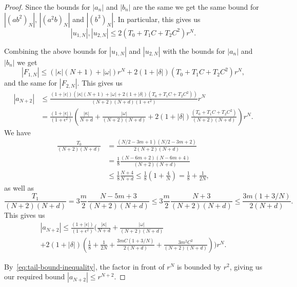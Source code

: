 \documentclass[11pt]{article}
\begin{document}
\begin{proof}
  Since the bounds for \(|a_n|\) and \(|b_n|\) are the same we get the
  same bound for \(|(ab^2)_N|\), \(|(a^2b)_N|\) and \(|(b^3)_N|\). In
  particular, this gives us
  \begin{equation*}
    |u_{1,N}|, |u_{2,N}| \leq 2(T_{0} + T_{1}C + T_{2}C^{2})r^{N}.
  \end{equation*}

  Combining the above bounds for \(|u_{1,N}|\) and \(|u_{2,N}|\) with
  the bounds for \(|a_n|\) and \(|b_n|\) we get
  \begin{equation*}
    |F_{1,N}| \leq (|\kappa|(N + 1) + |\omega|)r^{N} + 2(1 + |\delta|)(T_{0} + T_{1}C + T_{2}C^{2})r^{N},
  \end{equation*}
  and the same for \(|F_{2,N}|\). This gives us
  \begin{equation*}
    \begin{split}
      |a_{N + 2}|
      &\leq \frac{(1 + |\epsilon|)(|\kappa|(N + 1) + |\omega| + 2(1 + |\delta|)(T_{0} + T_{1}C + T_{2}C^{2}))}{(N + 2)(N + d)(1 + \epsilon^{2})}r^{N}\\
      &= \frac{(1 + |\epsilon|)}{(1 + \epsilon^{2})}\left(
        \frac{|\kappa|}{N + d}
        + \frac{|\omega|}{(N + 2)(N + d)}
        + 2(1 + |\delta|)\frac{(T_{0} + T_{1}C + T_{2}C^{2})}{(N + 2)(N + d)}
        \right)r^{N}.
    \end{split}
  \end{equation*}
  We have
  \begin{equation*}
    \begin{split}
      \frac{T_{0}}{(N + 2)(N + d)}
      &= \frac{(N/2 - 3m + 1)(N/2 - 3m + 2)}{2(N + 2)(N + d)}\\
      &= \frac{1}{8}\frac{(N - 6m + 2)(N - 6m + 4)}{(N + 2)(N + d)}\\
      &\leq \frac{1}{8}\frac{N + 4}{N + d}
        \leq \frac{1}{8}\left(1 + \frac{4}{N}\right)
        = \frac{1}{8} + \frac{1}{2N},
    \end{split}
  \end{equation*}
  as well as
  \begin{equation*}
    \frac{T_{1}}{(N + 2)(N + d)}
    = 3\frac{m}{2}\frac{N - 5m + 3}{(N + 2)(N + d)}
    \leq 3\frac{m}{2}\frac{N + 3}{(N + 2)(N + d)}
    \leq \frac{3m(1 + 3/N)}{2(N + d)}.
  \end{equation*}
  This gives us
  \begin{multline*}
    |a_{N + 2}|
    \leq \frac{(1 + |\epsilon|)}{(1 + \epsilon^{2})}\Bigg(
    \frac{|\kappa|}{N + d}
      + \frac{|\omega|}{(N + 2)(N + d)}\\
      + 2(1 + |\delta|)\left(
        \frac{1}{8} + \frac{1}{2N}
        + \frac{3mC(1 + 3/N)}{2(N + d)}
        + \frac{3m^{2}C^{2}}{(N + 2)(N + d)}
      \right)
    \Bigg)r^{N}.
  \end{multline*}

  By~\eqref{eq:tail-bound-inequality}, the factor in front of
  \(r^{N}\) is bounded by \(r^{2}\), giving us our required bound
  \(|a_{N + 2}| \leq r^{N + 2}\).
\end{proof}
\end{document}

